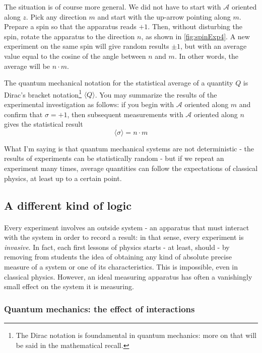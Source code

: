 \documentclass[a4paper,10pt]{article}
\begin{document}
The situation is of course more general. We did not have to start with $\mathcal{A}$ oriented along $z$. Pick any direction $m$ and start with the up-arrow pointing along $m$. Prepare a spin so that the apparatus reads $+1$. Then, without disturbing the spin, rotate the apparatus to the direction $n$, as shown in \autoref{fig:spinExp4}. A new experiment on the same spin will give random results $\pm 1$, but with an average value equal to the cosine of the angle between $n$ and $m$. In other words, the average will be $n \cdot m$.

The quantum mechanical notation for the statistical average of a quantity $Q$ is Dirac's bracket notation\footnote{The Dirac notation is foundamental in quantum mechanics: more on that will be said in the mathematical recall.} $\langle Q\rangle$. You may summarize the results of the experimental investigation as follows: if you begin with $\mathcal{A}$ oriented along $m$ and confirm that $\sigma = +1$, then subsequent measurements with $\mathcal{A}$ oriented along $n$ gives the statistical result
$$\langle\sigma\rangle = n \cdot m$$

What I'm saying is that quantum mechanical systems are not deterministic - the results of experiments can be statistically random - but if we repeat an experiment many times, average quantities can follow the expectations of classical physics, at least up to a certain point.

\subsection{A different kind of logic}

\paragraph{} Every experiment involves an outside system - an apparatus that must interact with the system in order to record a result: in that sense, every experiment is \textit{invasive}. In fact, each first lessons of physics starts - at least, should - by removing from students the idea of obtaining any kind of absolute precise measure of a system or one of its characteristics. This is impossible, even in classical physics. However, an ideal measuring apparatus has often a vanishingly small effect on the system it is measuring.

\subsubsection{Quantum mechanics: the effect of interactions}
\end{document}
